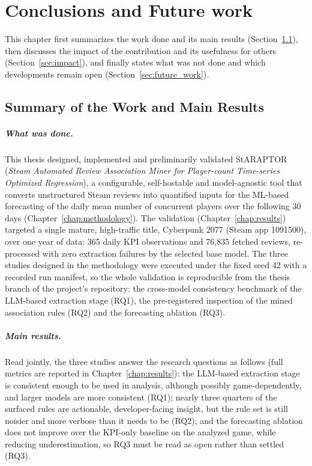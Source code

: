 \chapter{Conclusions and Future work}
\label{chap:conclusions}

\noindent This chapter first summarizes the work done and its main results (Section~\ref{sec:conclusions_summary}), then discusses the impact of the contribution and its usefulness for others (Section~\ref{sec:impact}), and finally states what was not done and which developments remain open (Section~\ref{sec:future_work}).

\section{Summary of the Work and Main Results}
\label{sec:conclusions_summary}

\paragraph{What was done.} This thesis designed, implemented and preliminarily validated StARAPTOR (\emph{Steam Automated Review Association Miner for Player-count Time-series Optimized Regression}), a configurable, self-hostable and model-agnostic tool that converts unstructured Steam reviews into quantified inputs for the ML-based forecasting of the daily mean number of concurrent players over the following 30 days (Chapter~\ref{chap:methodology}). The validation (Chapter~\ref{chap:results}) targeted a single mature, high-traffic title, Cyberpunk 2077 (Steam app 1091500), over one year of data: 365 daily KPI observations and 76{,}835 fetched reviews, re-processed with zero extraction failures by the selected base model. The three studies designed in the methodology were executed under the fixed seed 42 with a recorded run manifest, so the whole validation is reproducible from the thesis branch of the project's repository: the cross-model consistency benchmark of the LLM-based extraction stage (RQ1), the pre-registered inspection of the mined association rules (RQ2) and the forecasting ablation (RQ3).

\paragraph{Main results.} Read jointly, the three studies answer the research questions as follows (full metrics are reported in Chapter~\ref{chap:results}): the LLM-based extraction stage is consistent enough to be used in analysis, although possibly game-dependently, and larger models are more consistent (RQ1); nearly three quarters of the surfaced rules are actionable, developer-facing insight, but the rule set is still noisier and more verbose than it needs to be (RQ2); and the forecasting ablation does not improve over the KPI-only baseline on the analyzed game, while reducing underestimation, so RQ3 must be read as open rather than settled (RQ3).


